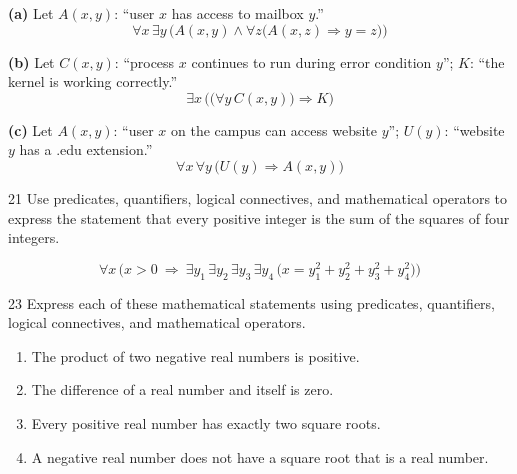\documentclass[11pt]{article}
\begin{document}
\begin{solution}

\medskip
\noindent\textbf{(a)} Let $A(x,y)$: ``user $x$ has access to mailbox $y$.''
\[
\forall x\,\exists y\,\Big(A(x,y)\wedge\forall z\big(A(x,z)\Rightarrow y=z\big)\Big)
\]

\medskip
\noindent\textbf{(b)} Let $C(x,y)$: ``process $x$ continues to run during error condition $y$'';
$K$: ``the kernel is working correctly.''
\[
\exists x\,\Big(\big(\forall y\, C(x,y)\big)\Rightarrow K\Big)
\]

\medskip
\noindent\textbf{(c)} Let $A(x,y)$: ``user $x$ on the campus can access website $y$'';
$U(y)$: ``website $y$ has a .edu extension.''
\[
\forall x\,\forall y\,\big(U(y)\Rightarrow A(x,y)\big)
\]

\end{solution}

\begin{exercise}{21}
    Use predicates, quantifiers, logical connectives, and mathematical
    operators to express the statement that every positive integer is
    the sum of the squares of four integers.
\end{exercise}

\begin{solution}
\[
\forall x\,\Big(x>0\ \Rightarrow\ \exists y_1\,\exists y_2\,\exists y_3\,\exists y_4\,\big(x=y_1^2+y_2^2+y_3^2+y_4^2\big)\Big)
\]
\end{solution}

\begin{exercise}{23}
    Express each of these mathematical statements using predicates,
    quantifiers, logical connectives, and mathematical operators.
    \begin{enumerate}[label=(\alph*)]
        \item The product of two negative real numbers is positive.
        \item The difference of a real number and itself is zero.
        \item Every positive real number has exactly two square roots.
        \item A negative real number does not have a square root that is a real number.
    \end{enumerate}
\end{exercise}
\end{document}
